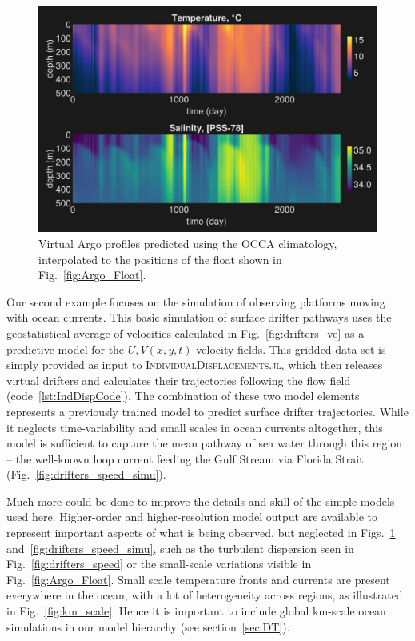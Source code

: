 \documentclass{juliacon}[12pt]
\newcommand{\pkg}[1]{{\small \textsc{#1}}}
\begin{document}
\begin{figure}[t]
\centerline{\includegraphics[width=\columnwidth]{figs/20240529_MITprof_OCCA.png}}
\caption{Virtual Argo profiles predicted using the OCCA climatology, interpolated to the positions of the float shown in Fig.~\ref{fig:Argo_Float}.}
\label{fig:Argo_Float_simu}
\end{figure}

Our second example focuses on the simulation of observing platforms moving with ocean currents. This basic simulation of surface drifter pathways uses the geostatistical average of velocities calculated in Fig.~\ref{fig:drifters_ve} as a predictive model for the $U,V(x,y,t)$ velocity fields. This gridded data set is simply provided as input to \pkg{IndividualDisplacements.jl}, which then releases virtual drifters and calculates their trajectories following the flow field (code~\ref{lst:IndDispCode}). The combination of these two model elements represents a previously trained model to predict surface drifter trajectories. While it neglects time-variability and small scales in ocean currents altogether, this model is sufficient to capture the mean pathway of sea water through this region -- the well-known loop current feeding the Gulf Stream via Florida Strait (Fig.~\ref{fig:drifters_speed_simu}).

Much more could be done to improve the details and skill of the simple models used here. Higher-order and higher-resolution model output are available to represent important aspects of what is being observed, but neglected in Figs.~\ref{fig:Argo_Float_simu} and~\ref{fig:drifters_speed_simu}, such as the turbulent dispersion seen in Fig.~\ref{fig:drifters_speed} or the small-scale variations visible in Fig.~\ref{fig:Argo_Float}. Small scale temperature fronts and currents are present everywhere in the ocean, with a lot of heterogeneity across regions, as illustrated in Fig.~\ref{fig:km_scale}. Hence it is important to include global km-scale ocean simulations in our model hierarchy (see section~\ref{sec:DT}). 
\end{document}
